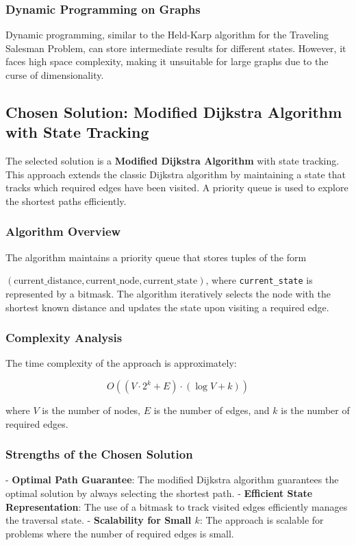 \documentclass{article}
\begin{document}
\subsubsection{Dynamic Programming on Graphs}
Dynamic programming, similar to the Held-Karp algorithm for the Traveling Salesman Problem, can store intermediate results for different states. However, it faces high space complexity, making it unsuitable for large graphs due to the curse of dimensionality.

\subsection{Chosen Solution: Modified Dijkstra Algorithm with State Tracking}

The selected solution is a \textbf{Modified Dijkstra Algorithm} with state tracking. This approach extends the classic Dijkstra algorithm by maintaining a state that tracks which required edges have been visited. A priority queue is used to explore the shortest paths efficiently.

\subsubsection{Algorithm Overview}
The algorithm maintains a priority queue that stores tuples of the form 


$(\text{current\_distance}, \text{current\_node}, \text{current\_state})$, 
where \texttt{current\_state} is represented by a bitmask. The algorithm iteratively selects the node with the shortest known distance and updates the state upon visiting a required edge.

\subsubsection{Complexity Analysis}
The time complexity of the approach is approximately:

\[
O((V \cdot 2^k + E) \cdot (\log V + k))
\]

where $V$ is the number of nodes, $E$ is the number of edges, and $k$ is the number of required edges.

\subsubsection{Strengths of the Chosen Solution}
- \textbf{Optimal Path Guarantee}: The modified Dijkstra algorithm guarantees the optimal solution by always selecting the shortest path.
- \textbf{Efficient State Representation}: The use of a bitmask to track visited edges efficiently manages the traversal state.
- \textbf{Scalability for Small $k$}: The approach is scalable for problems where the number of required edges is small.
\end{document}
